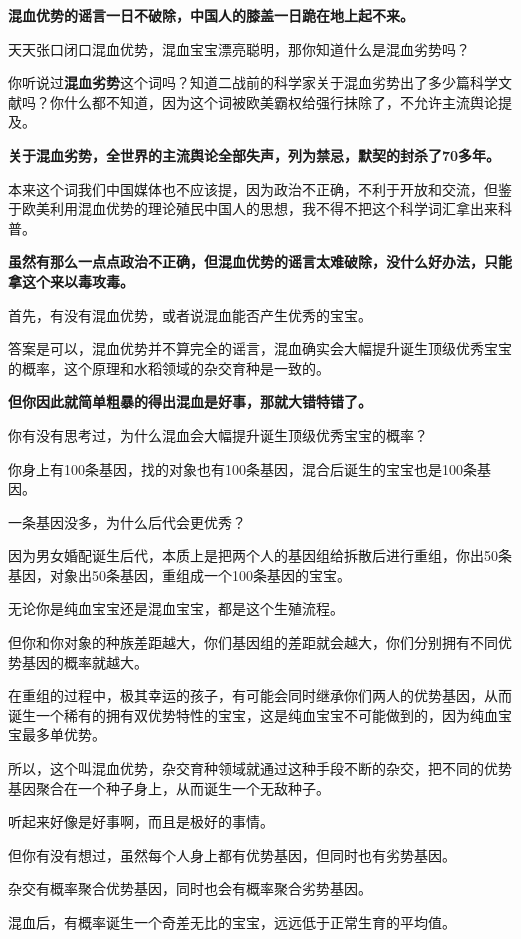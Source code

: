\documentclass[UTF8, 11pt, oneside]{ctexart}
\newcommand{\zd}[1]{\textbf{\textcolor[RGB]{123,12,0}{#1}}} %
\begin{document}
\zd{混血优势的谣言一日不破除，中国人的膝盖一日跪在地上起不来。}

天天张口闭口混血优势，混血宝宝漂亮聪明，那你知道什么是混血劣势吗？

你听说过\zd{混血劣势}这个词吗？知道二战前的科学家关于混血劣势出了多少篇科学文献吗？你什么都不知道，因为这个词被欧美霸权给强行抹除了，不允许主流舆论提及。

\zd{关于混血劣势，全世界的主流舆论全部失声，列为禁忌，默契的封杀了70多年。}

本来这个词我们中国媒体也不应该提，因为政治不正确，不利于开放和交流，但鉴于欧美利用混血优势的理论殖民中国人的思想，我不得不把这个科学词汇拿出来科普。

\zd{虽然有那么一点点政治不正确，但混血优势的谣言太难破除，没什么好办法，只能拿这个来以毒攻毒。}

首先，有没有混血优势，或者说混血能否产生优秀的宝宝。

答案是可以，混血优势并不算完全的谣言，混血确实会大幅提升诞生顶级优秀宝宝的概率，这个原理和水稻领域的杂交育种是一致的。

\zd{但你因此就简单粗暴的得出混血是好事，那就大错特错了。}

你有没有思考过，为什么混血会大幅提升诞生顶级优秀宝宝的概率？

你身上有100条基因，找的对象也有100条基因，混合后诞生的宝宝也是100条基因。

一条基因没多，为什么后代会更优秀？

因为男女婚配诞生后代，本质上是把两个人的基因组给拆散后进行重组，你出50条基因，对象出50条基因，重组成一个100条基因的宝宝。

无论你是纯血宝宝还是混血宝宝，都是这个生殖流程。

但你和你对象的种族差距越大，你们基因组的差距就会越大，你们分别拥有不同优势基因的概率就越大。

在重组的过程中，极其幸运的孩子，有可能会同时继承你们两人的优势基因，从而诞生一个稀有的拥有双优势特性的宝宝，这是纯血宝宝不可能做到的，因为纯血宝宝最多单优势。

所以，这个叫混血优势，杂交育种领域就通过这种手段不断的杂交，把不同的优势基因聚合在一个种子身上，从而诞生一个无敌种子。

听起来好像是好事啊，而且是极好的事情。

但你有没有想过，虽然每个人身上都有优势基因，但同时也有劣势基因。

杂交有概率聚合优势基因，同时也会有概率聚合劣势基因。

混血后，有概率诞生一个奇差无比的宝宝，远远低于正常生育的平均值。
\end{document}
